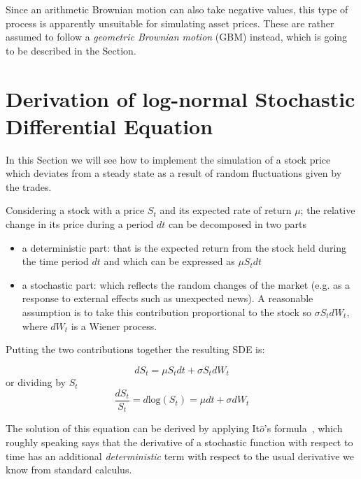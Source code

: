 Since an arithmetic Brownian motion can also take
negative values, this type of process is apparently unsuitable for
simulating asset prices. These are rather assumed to follow a \emph{geometric
Brownian motion} (GBM) instead, which is going to be described in the Section. 

\section{Derivation of log-normal Stochastic Differential Equation}
\label{derivation-of-log-normal-stochastic-differential-equation}

In this Section we will see how to implement the simulation of a stock price 
which deviates from a steady state as a result of random fluctuations given by the trades. 

Considering a stock with a price \(S_t\) and its expected rate of return \(\mu\); the relative change in its price during a period \(dt\) can be decomposed in two parts

\begin{itemize}
	\tightlist
	\item
	a deterministic part: that is the expected return from the stock held
	during the time period \(dt\) and which can be expressed as \(\mu S_tdt\)
	\item
	a stochastic part: which reflects the random changes of the market
	(e.g. as a response to external effects such as unexpected news). A
	reasonable assumption is to take this contribution proportional to the
	stock so \(\sigma S_t dW_t\), where \(dW_t\) is a Wiener process.
\end{itemize}
Putting the two contributions together the resulting SDE is:

\begin{equation}
dS_t = \mu S_t dt + \sigma S_t dW_t
\label{eq:differential}
\end{equation}
or dividing by $S_t$
\begin{equation}
\frac{dS_t}{S_t} = d\textrm{log}(S_t) = \mu dt + \sigma dW_t
\label{eq:differential_relative}
\end{equation}

The solution of this equation can be derived by applying
It\(\hat{o}\)'s formula~\cite{bib:ito_lemma}, which roughly speaking says
that the derivative of a stochastic function with respect to time has 
an additional \emph{deterministic} term with respect to the usual derivative
we know from standard calculus. 

